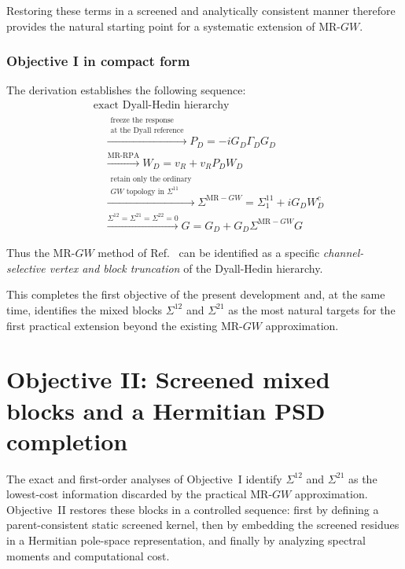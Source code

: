 \documentclass[aip,jcp,reprint,noshowkeys,superscriptaddress]{revtex4-1}
\begin{document}
Restoring these terms in a screened and analytically consistent manner
therefore provides the natural starting point for a systematic
extension of MR-$GW$.


\subsubsection{Objective I in compact form}

The derivation establishes the following sequence:
\begin{equation}
  \begin{aligned}
  &\text{exact Dyall-Hedin hierarchy}
  \\
  &\quad
  \xrightarrow{
    \substack{
    \text{freeze the response}\\
    \text{at the Dyall reference}
    }
  }
  P_D
  =
  -iG_D\Gamma_DG_D
  \\
  &\quad
  \xrightarrow{
    \text{MR-RPA}
  }
  W_D
  =
  v_R+v_RP_DW_D
  \\
  &\quad
  \xrightarrow{
    \substack{
    \text{retain only the ordinary}\\
    GW\text{ topology in }\Sigma^{11}
    }
  }
  \Sigma^{\mathrm{MR-}GW}
  =
  \Sigma_1^{11}
  +
  iG_DW_D^c
  \\
  &\quad
  \xrightarrow{
    \Sigma^{12}
    =
    \Sigma^{21}
    =
    \Sigma^{22}
    =
    0
  }
  G
  =
  G_D
  +
  G_D
  \Sigma^{\mathrm{MR-}GW}
  G
  \end{aligned}
  \label{eq:objective-I-summary}
\end{equation}

Thus the MR-$GW$ method of Ref.~\cite{WangFangLi2026} can be
identified as a specific \emph{channel-selective vertex and block
truncation} of the Dyall-Hedin hierarchy.

This completes the first objective of the present development and,
at the same time, identifies the mixed blocks
$\Sigma^{12}$ and $\Sigma^{21}$ as the most natural targets for the
first practical extension beyond the existing MR-$GW$ approximation.
\section{Objective II: Screened mixed blocks and a Hermitian PSD completion}
\label{sec:objective-II}

The exact and first-order analyses of Objective~I identify
$\Sigma^{12}$ and $\Sigma^{21}$ as the lowest-cost information discarded by
the practical MR-$GW$ approximation.  Objective~II restores these blocks in a
controlled sequence: first by defining a parent-consistent static screened
kernel, then by embedding the screened residues in a Hermitian pole-space
representation, and finally by analyzing spectral moments and computational
cost.
\end{document}
